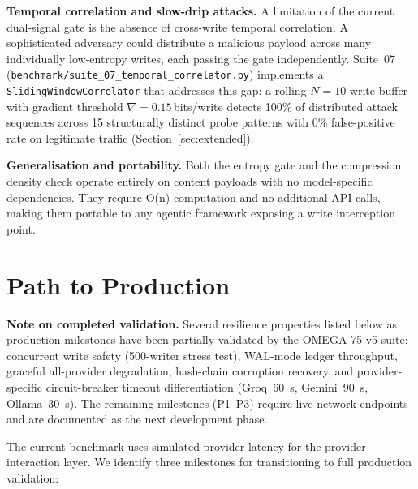 \documentclass[11pt,twocolumn]{article}
\begin{document}
\textbf{Temporal correlation and slow-drip attacks.}
A limitation of the current dual-signal gate is the absence of
cross-write temporal correlation. A sophisticated adversary could
distribute a malicious payload across many individually low-entropy
writes, each passing the gate independently. Suite~07 (\texttt{benchmark/suite\_07\_temporal\_correlator.py})
implements a \texttt{SlidingWindowCorrelator} that addresses this
gap: a rolling $N=10$ write buffer with gradient threshold
$\nabla=0.15$\,bits/write detects 100\% of distributed attack
sequences across 15 structurally distinct probe patterns with 0\%
false-positive rate on legitimate traffic
(Section~\ref{sec:extended}).

\textbf{Generalisation and portability.}
Both the entropy gate and the compression density check operate
entirely on content payloads with no model-specific dependencies.
They require O(n) computation and no additional API calls, making them
portable to any agentic framework exposing a write interception point.

\vspace{-4pt}
\section{Path to Production}
\label{sec:production}

\textbf{Note on completed validation.}
Several resilience properties listed below as production milestones
have been partially validated by the OMEGA-75 v5 suite: concurrent
write safety (500-writer stress test), WAL-mode ledger throughput,
graceful all-provider degradation, hash-chain corruption recovery, and
provider-specific circuit-breaker timeout differentiation (Groq~60~s,
Gemini~90~s, Ollama~30~s). The remaining milestones (P1--P3) require
live network endpoints and are documented as the next development phase.

The current benchmark uses simulated provider latency for the provider
interaction layer. We identify three milestones for transitioning to
full production validation:
\end{document}
